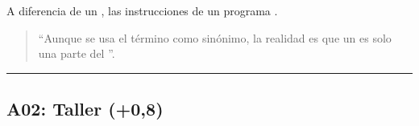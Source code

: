 \documentclass[letterpaper,10pt,spanish]{sphinxmanual}
\begin{document}
\sphinxAtStartPar
A diferencia de un , las instrucciones de un programa .
\begin{quote}

\sphinxAtStartPar
“Aunque se usa el término  como sinónimo, la realidad es que un  es solo una parte del ”.
\end{quote}


\bigskip\hrule\bigskip



\subsection{A02: Taller (+0,8)}
\label{\detokenize{1_guias/10programacion/G1022:a02-taller-0-8}}
\sphinxAtStartPar
{}
\end{document}
